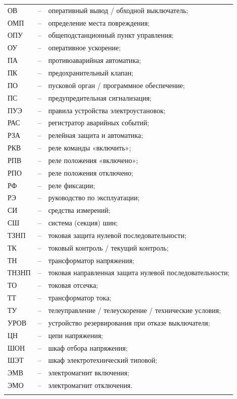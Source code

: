 \begin{longtable}{>{\raggedright\arraybackslash}m{2cm}>{\raggedright\arraybackslash}m{0.5cm}>{\raggedright\arraybackslash}m{20cm}}
ОВ & -- & оперативный вывод / обходной выключатель; \\
ОМП & -- & определение места повреждения; \\
ОПУ & -- & общеподстанционный пункт управления; \\
ОУ & -- & оперативное ускорение; \\
ПА & -- & противоаварийная автоматика; \\
ПК & -- & предохранительный клапан; \\
ПО & -- & пусковой орган / программное обеспечение; \\
ПС & -- & предупредительная сигнализация; \\
ПУЭ & -- & правила устройства электроустановок; \\
РАС & -- & регистратор аварийных событий; \\
РЗА & -- & релейная защита и автоматика; \\
РКВ & -- & реле команды «включить»; \\
РПВ & -- & реле положения «включено»; \\
РПО & -- & реле положения отключено; \\
РФ & -- & реле фиксации; \\
РЭ & -- & руководство по эксплуатации; \\
СИ & -- & средства измерений; \\
СШ & -- & система (секция) шин; \\
ТЗНП & -- & токовая защита нулевой последовательности; \\
ТК & -- & токовый контроль / текущий контроль; \\
ТН & -- & трансформатор напряжения; \\
ТНЗНП & -- & токовая направленная защита нулевой последовательности; \\
ТО & -- & токовая отсечка; \\
ТТ & -- & трансформатор тока; \\
ТУ & -- & телеуправление / телеускорение / технические условия; \\
УРОВ & -- & устройство резервирования при отказе выключателя; \\
ЦН & -- & цепи напряжения; \\
ШОН & -- & шкаф отбора напряжения; \\
ШЭТ & -- & шкаф электротехнический типовой; \\
ЭМВ & -- & электромагнит включения; \\
ЭМО & -- & электромагнит отключения. \\
{\color{white}\fontsize{0.1pt}{0.1pt}\selectfont<endABBRS>}
\end{longtable}
